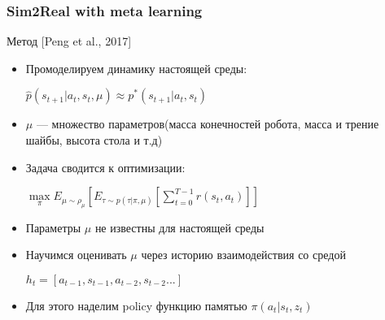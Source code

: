 \documentclass[fleqn, xcolor=x11names]{beamer}
\begin{document}
\begin{frame}\frametitle{Sim2Real with meta learning}

\begin{block}{{\footnotesize Метод [Peng et al., 2017]}}
{\footnotesize
\begin{itemize}

\item Промоделируем динамику настоящей среды:  
\begin{center}
$\hat{p}(s_{t+1}|a_t, s_t, \mu) \approx p^*(s_{t+1}|a_t, s_t)$
\end{center} 

\item $\mu$ --- множество параметров(масса конечностей робота, масса и трение шайбы, высота стола и т.д)

\item Задача сводится к оптимизации:
\begin{center}
$ \max \limits_{\pi} E_{\mu \sim \rho_{\mu}} \left[ E_{\tau \sim p(\tau|\pi,\mu)} \left[  \sum \limits_{t=0}^{T-1} r(s_t, a_t) \right] \right]$
\end{center} 

\item Параметры $\mu$ не известны для настоящей среды

\item Научимся оценивать $\mu$ через историю взаимодействия со средой 
\begin{center} $h_t = [a_{t-1}, s_{t-1}, a_{t-2}, s_{t-2}...]$ \end{center} 

\item Для этого наделим policy функцию памятью $\pi(a_t|s_t, z_t)$

\end{itemize}
}
\end{block}

\end{frame}
\end{document}
